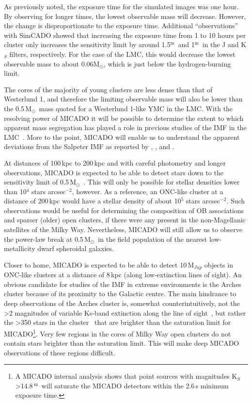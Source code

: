 \documentclass{aa}
\newcommand{\m}{$^\mathrm{m}$~}
\newcommand{\msun}{M$_\odot$~}
\newcommand{\msune}{M$_\odot$}
\newcommand{\h}[1]{$^{#1}$}
\newcommand{\spae}{stars arcsec$^{-2}$}
\begin{document}
As previously noted, the exposure time for the simulated images was one hour.
By observing for longer times, the lowest observable mass will decrease.
However, the change is disproportionate to the exposure time.
Additional ``observations'' with SimCADO showed that increasing the exposure time from 1 to 10 hours per cluster only increases the sensitivity limit by around 1.5\m and 1\m in the J and K$_S$ filters, respectively.
For the case of the LMC, this would decrease the lowest observable mass to about 0.06\msune, which is just below the hydrogen-burning limit.

The cores of the majority of young clusters are less dense than that of Westerlund 1, and therefore the limiting observable mass will also be lower than the 0.5\,\msun mass quoted for a Westerlund 1-like YMC in the LMC\@.
With the resolving power of MICADO it will be possible to determine the extent to which apparent mass segregation has played a role in previous studies of the IMF in the LMC~\citep{Ascenso2009-de}.
More to the point, MICADO will enable us to understand the apparent deviations from the Salpeter IMF as reported by \citet{dario2009}, \citet{geha2013}, and \citet{kalirai2013}.

At distances of 100\,kpc to 200\,kpc and with careful photometry and longer observations, MICADO is expected to be able to detect stars down to the sensitivity limit of 0.5\,\msun.
This will only be possible for stellar densities lower than 10\h4 \spae, however.
As a reference, an ONC-like cluster at a distance of 200\,kpc would have a stellar density of about 10\h5 \spae.
Such observations would be useful for determining the composition of OB associations and sparser (older) open clusters, if there were any present in the non-Magellanic satellites of the Milky Way.
Nevertheless, MICADO will still allow us to observe the power-law break at 0.5\,\msun in the field population of the nearest low-metallicity dwarf spheroidal galaxies.

Closer to home, MICADO is expected to be able to detect 10\,M$_{Jup}$ objects in ONC-like clusters at a distance of 8\,kpc (along low-extinction lines of sight).
An obvious candidate for studies of the IMF in extreme environments is the Arches cluster because of its proximity to the Galactic centre.
The main hindrance to deep observations of the Arches cluster is, somewhat counterintuitively, not the \textgreater2 magnitudes of variable Ks-band extinction along the line of sight~\citep{espinoza2009}, but rather the \textgreater350 stars in the cluster~\citep{galacticnucleaus} that are brighter than the saturation limit for MICADO\footnote{A MICADO internal analysis shows that point sources with magnitudes K$_S$\textgreater14.8\,\m will saturate the MICADO detectors within the 2.6\,s minimum exposure time.}.
Very few regions in the cores of Milky Way open clusters do not contain stars brighter than the saturation limit.
This will make deep MICADO observations of these regions difficult.
\end{document}
